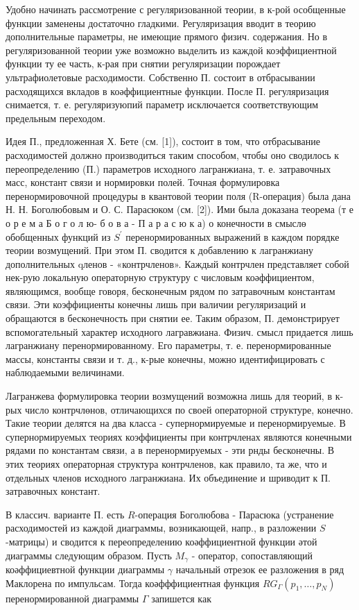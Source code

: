 \documentclass[10pt]{article}
\begin{document}
Удобно начинать рассмотрение с регуляризованной теории, в к-рой особщенные функции заменены достаточно гладкими. Регуляризация вводит в теорию дополнительные параметры, не имеющие прямого физич. содержания. Но в регуляризованной теории уже возможно выделить из каждой коэффициентной функции ту ее часть, к-рая при снятии регуляризации порождает ультрафиолетовые расходимости. Собственно П. состоит в отбрасывании расходящихся вкладов в коәффициентные функции. После П. регуляризация снимается, т. е. регуляризуюпий параметр исключается соответствующим предельным переходом.

Идея П., предложенная Х. Бете (см. [1]), состоит в том, что отбрасывание расходимостей должно производиться таким способом, чтобы оно сводилось к переопределению (П.) параметров исходного лагранжиана, т. е. затравочных масс, констант связи и нормировки полей. Точная формулировка перенормировочной процедуры в квантовой теории поля (R-операция) была дана Н. Н. Боголюбовым и О. С. Парасюком (см. [2]). Ими была доказана теорема (т е о р е м а Б о г о л ю- б о в а - П а р а с ю к а) о конечности в смыслө обобщенных функций из $S^{\prime}$ перенормированных выражений в каждом порядке теории возмущений. При этом П. сводится к добавлению к лагранжиану дополнительных qленов - «контрчленов». Каждый контрчлен представляет собой нек-рую локальную операторную структуру с числовым коәффициентом, являющимся, вообще говоря, бесконечным рядом по затравочным константам связи. Эти коэффициенты конечны лишь при валичии регуляризаций и обращаются в бесконечность при снятии ее. Таким образом, П. демонстрирует вспомогательный характер исходного лагравжиана. Физич. смысл придается лишь лагранжиану перенормированному. Его параметры, т. е. перенормированные массы, константы связи и т. д., к-рые конечны, можно идентифицировать с наблюдаемыми величинами.

Лагранжева формулировка теории возмущений возможна лишь для теорий, в к-рых число контрчлөнов, отличающихся по своей операторной структуре, конечно. Такие теории делятся на два класса - супернормируемые и перенормируемые. В супернормируемых теориях коэффициенты при контрчленах являются конечными рядами по константам связи, а в перенормируемых - эти рнды бесконечны. В этих теориях операторная структура контрчленов, как правило, та же, что и отдельных членов исходного лагранжиана. Их объединение и шриводит к П. затравочных констант.

В классич. варианте П. есть $R$-операция Боголюбова - Парасюка (устранение расходимостей из каждой диаграммы, возникающей, напр., в разложении $S$-матрицы) и сводится к переопределению коәффициентной функции әтой диаграммы следующим образом. Пусть $M_{\gamma}$ - оператор, сопоставляющий коәффициевтной функции диаграммы $\gamma$ начальный отрезок ее разложения в ряд Маклорена по импульсам. Тогда коәфффициентная функция $R G_{\Gamma}\left(p_{1}, \ldots, p_{N}\right)$ перенормированной диаграммы $\Gamma$ запишется как
\end{document}
